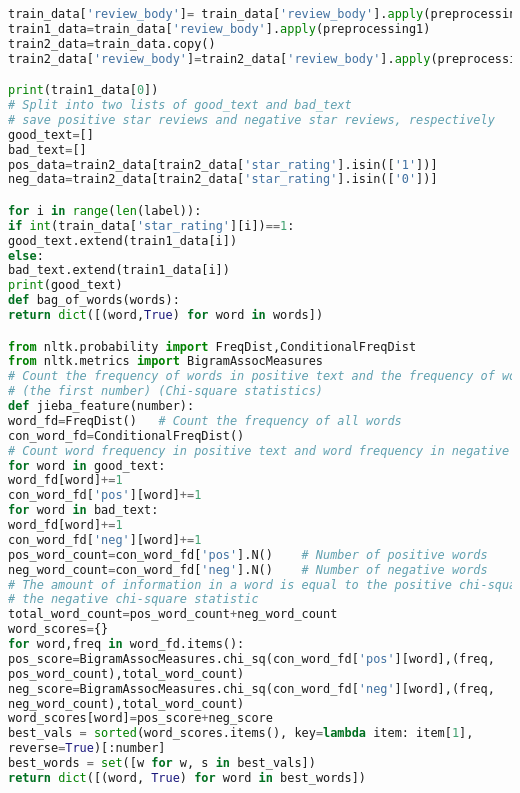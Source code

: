 \documentclass{mcmthesis}
\begin{document}
\begin{appendices}
\begin{lstlisting}[language=python]
train_data['review_body']= train_data['review_body'].apply(preprocessing)
train1_data=train_data['review_body'].apply(preprocessing1)
train2_data=train_data.copy()
train2_data['review_body']=train2_data['review_body'].apply(preprocessing1)

print(train1_data[0])
# Split into two lists of good_text and bad_text
# save positive star reviews and negative star reviews, respectively
good_text=[]
bad_text=[]
pos_data=train2_data[train2_data['star_rating'].isin(['1'])]
neg_data=train2_data[train2_data['star_rating'].isin(['0'])]

for i in range(len(label)):
if int(train_data['star_rating'][i])==1:
good_text.extend(train1_data[i])
else:
bad_text.extend(train1_data[i])
print(good_text)
def bag_of_words(words):
return dict([(word,True) for word in words])

from nltk.probability import FreqDist,ConditionalFreqDist
from nltk.metrics import BigramAssocMeasures
# Count the frequency of words in positive text and the frequency of words in negative # text and obtain features (words) with higher information content 
# (the first number) (Chi-square statistics)
def jieba_feature(number):
word_fd=FreqDist()   # Count the frequency of all words
con_word_fd=ConditionalFreqDist()
# Count word frequency in positive text and word frequency in negative text
for word in good_text:
word_fd[word]+=1
con_word_fd['pos'][word]+=1
for word in bad_text:
word_fd[word]+=1
con_word_fd['neg'][word]+=1
pos_word_count=con_word_fd['pos'].N()    # Number of positive words
neg_word_count=con_word_fd['neg'].N()    # Number of negative words
# The amount of information in a word is equal to the positive chi-square statistic plus 
# the negative chi-square statistic
total_word_count=pos_word_count+neg_word_count
word_scores={}
for word,freq in word_fd.items():
pos_score=BigramAssocMeasures.chi_sq(con_word_fd['pos'][word],(freq,
pos_word_count),total_word_count)
neg_score=BigramAssocMeasures.chi_sq(con_word_fd['neg'][word],(freq,
neg_word_count),total_word_count)
word_scores[word]=pos_score+neg_score
best_vals = sorted(word_scores.items(), key=lambda item: item[1],
reverse=True)[:number]
best_words = set([w for w, s in best_vals])
return dict([(word, True) for word in best_words])


\end{lstlisting}
\end{appendices}
\end{document}
